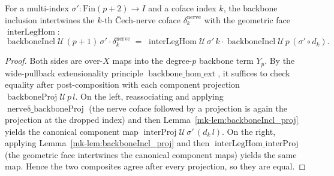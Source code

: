 \begin{lemma}
  \label{mk-lem:backboneIncl_nerveδ}

  For a multi-index \(\sigma' : \mathrm{Fin}(p+2) \to I\) and a coface index \(k\), the backbone
  inclusion intertwines the \(k\)-th {\v C}ech-nerve coface \(\delta^{\mathrm{nerve}}_k\) with the
  geometric face \(\operatorname{interLegHom}\):
  \[
    \operatorname{backboneIncl}\mathcal{U}\,(p+1)\,\sigma'\cdot \delta^{\mathrm{nerve}}_k
      \;=\;
    \operatorname{interLegHom}\mathcal{U}\,\sigma'\,k\cdot
      \operatorname{backboneIncl}\mathcal{U}\,p\,(\sigma' \circ d_k).
  \]
\end{lemma}
\begin{proof}
  Both sides are over-\(X\) maps into the degree-\(p\) backbone term \(Y_p\). By the wide-pullback
  extensionality principle \(\operatorname{backbone\_hom\_ext}\), it suffices to check equality after
  post-composition with each component projection \(\operatorname{backboneProj}\mathcal{U}\,p\,l\).
  On the left, reassociating and applying \(\operatorname{nerveδ\_backboneProj}\) (the nerve coface
  followed by a projection is again the projection at the dropped index) and then
  Lemma~\ref{mk-lem:backboneIncl_proj} yields the canonical component map
  \(\operatorname{interProj}\mathcal{U}\,\sigma'\,(d_k\,l)\). On the right, applying
  Lemma~\ref{mk-lem:backboneIncl_proj} and then \(\operatorname{interLegHom\_interProj}\) (the geometric
  face intertwines the canonical component maps) yields the same map. Hence the two composites agree
  after every projection, so they are equal.
\end{proof}

